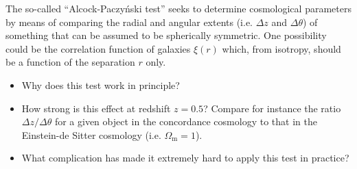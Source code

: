 \documentclass[a4paper]{article}
\begin{document}
The so-called “Alcock-Paczy\'{n}ski test” seeks to determine cosmological parameters by means of comparing the radial and angular extents (i.e. $\Delta z$ and $\Delta\theta$) of something that can be assumed to be spherically symmetric. One possibility could be the correlation function of galaxies $\xi(r)$ which, from isotropy, should be a function of the separation $r$ only.

\begin{itemize}
    \item[(a)] Why does this test work in principle?
    
    \item[(b)] How strong is this effect at redshift $z=0.5$? Compare for instance the ratio $\Delta z/\Delta\theta$ for a given object in the concordance cosmology to that in the Einstein-de Sitter cosmology (i.e. $\Omega_\mathrm{m}=1$).
    
    \item[(c)] What complication has made it extremely hard to apply this test in practice?
\end{itemize}
\end{document}
